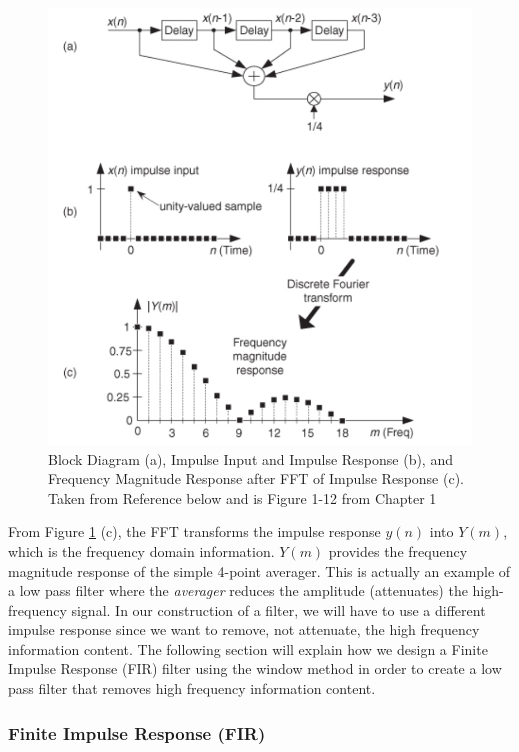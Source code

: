 \begin{figure}[h!]
	\centering
	\includegraphics[scale = .6]{impulse.png} %
	\caption{Block Diagram (a), Impulse Input and Impulse Response (b), and Frequency Magnitude Response after FFT of Impulse Response (c).  Taken from Reference \cite{lyons:intro} below and is Figure 1-12 from Chapter 1}
	\label{fig:impulse}
\end{figure}    

From Figure \ref{fig:impulse} (c), the FFT transforms the impulse response $y(n)$ into $Y(m)$, which is the frequency domain information.  $Y(m)$ provides the frequency magnitude response of the simple 4-point averager.  This is actually an example of a low pass filter where the \textit{averager} reduces the amplitude (attenuates) the high-frequency  signal.  In our construction of a filter, we will have to use a different impulse response since we want to remove, not attenuate, the high frequency information content.  The following section will explain how we design a Finite Impulse Response (FIR) filter using the window method in order to create a low pass filter that removes high frequency information content. 

\subsubsection{Finite Impulse Response (FIR)}

